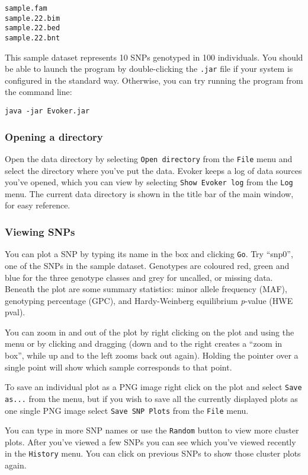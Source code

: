 \documentclass{article}
\begin{document}
\begin{verbatim}
sample.fam
sample.22.bim
sample.22.bed
sample.22.bnt
\end{verbatim}

This sample dataset represents 10 SNPs genotyped in 100 individuals. You should be able to launch the program by double-clicking the \texttt{.jar} file if your system is configured in the standard way. Otherwise, you can try running the program from the command line:

\begin{verbatim}
java -jar Evoker.jar
\end{verbatim}

\subsubsection{Opening a directory}
Open the data directory by selecting \texttt{Open directory} from the \texttt{File} menu and select the directory where you've put the data. Evoker keeps a log of data sources you've opened, which you can view by selecting \texttt{Show Evoker log} from the \texttt{Log} menu. The current data directory is shown in the title bar of the main window, for easy reference.

\subsubsection{Viewing SNPs}
You can plot a SNP by typing its name in the box and clicking \texttt{Go}. Try ``snp0'', one of the SNPs in the sample dataset. Genotypes are coloured red, green and blue for the three genotype classes and grey for uncalled, or missing data. Beneath the plot are some summary statistics: minor allele frequency (MAF), genotyping percentage (GPC), and Hardy-Weinberg equilibrium \emph{p}-value (HWE pval).
 
You can zoom in and out of the plot by right clicking on the plot and using the menu or by clicking and dragging (down and to the right creates a ``zoom in box'', while up and to the left zooms back out again). Holding the pointer over a single point will show which sample corresponds to that point.

To save an individual plot as a PNG image right click on the plot and select \texttt{Save as...} from the menu, but if you wish to save all the currently displayed plots as one single PNG image select \texttt{Save SNP Plots} from the \texttt{File} menu.

You can type in more SNP names or use the \texttt{Random} button to view more cluster plots. After you've viewed a few SNPs you can see which you've viewed recently in the \texttt{History} menu. You can click on previous SNPs to show those cluster plots again.
\end{document}
